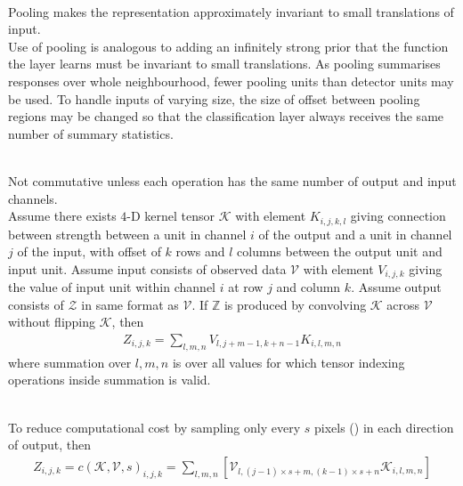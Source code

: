 \begin{remark} \\
Pooling makes the representation approximately invariant to small translations of input.\\
Use of pooling is analogous to adding an infinitely strong prior that the function the layer learns must be invariant to small translations. As pooling summarises responses over whole neighbourhood, fewer pooling units than detector units may be used. To handle inputs of varying size, the size of offset between pooling regions may be changed so that the classification layer always receives the same number of summary statistics.
\end{remark}

\begin{remark} \\
Not commutative unless each operation has the same number of output and input channels.\\
Assume there exists $4$-D kernel tensor $\mathcal{K}$ with element $K_{i,j,k,l}$ giving connection between strength between a unit in channel $i$ of the output and a unit in channel $j$ of the input, with offset of $k$ rows and $l$ columns between the output unit and input unit. Assume input consists of observed data $\mathcal{V}$ with element $V_{i,j,k}$ giving the value of input unit within channel $i$ at row $j$ and column $k$. Assume output consists of $\mathcal{Z}$ in same format as $\mathcal{V}$. If $\mathbb{Z}$ is produced by convolving $\mathcal{K}$ across $\mathcal{V}$ without flipping $\mathcal{K}$, then
\begin{align*}
Z_{i,j,k} = \sum\limits_{l, m, n} V_{l, j+m-1, k+n-1} K_{i,l,m,n} \nonumber
\end{align*}
where summation over $l,m,n$ is over all values for which tensor indexing operations inside summation is valid.
\end{remark}

\begin{remark} \\
To reduce computational cost by sampling only every $s$ pixels () in each direction of output, then
\begin{align*}
Z_{i,j,k} = c(\mathcal{K}, \mathcal{V}, s)_{i,j,k} = \sum\limits_{l,m,n} [\mathcal{V}_{l, (j-1) \times s + m, (k-1) \times s + n} \mathcal{K}_{i,l,m,n}] \nonumber
\end{align*}
\end{remark}

